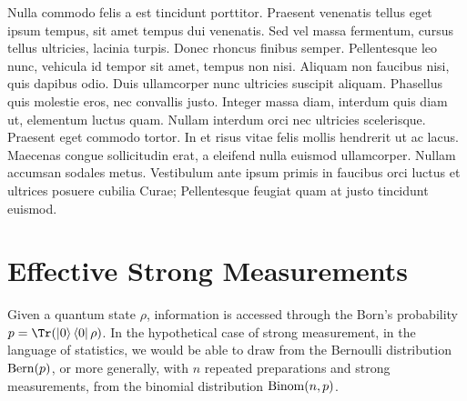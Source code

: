 \documentclass[aps,nofootinbib,prl,twocolumn,superscriptaddress]{revtex4}
\begin{document}
Nulla commodo felis a est tincidunt porttitor. Praesent venenatis tellus eget ipsum tempus, sit amet tempus dui venenatis. Sed vel massa fermentum, cursus tellus ultricies, lacinia turpis. Donec rhoncus finibus semper. Pellentesque leo nunc, vehicula id tempor sit amet, tempus non nisi. Aliquam non faucibus nisi, quis dapibus odio. Duis ullamcorper nunc ultricies suscipit aliquam. Phasellus quis molestie eros, nec convallis justo. Integer massa diam, interdum quis diam ut, elementum luctus quam. Nullam interdum orci nec ultricies scelerisque. Praesent eget commodo tortor. In et risus vitae felis mollis hendrerit ut ac lacus. Maecenas congue sollicitudin erat, a eleifend nulla euismod ullamcorper. Nullam accumsan sodales metus. Vestibulum ante ipsum primis in faucibus orci luctus et ultrices posuere cubilia Curae; Pellentesque feugiat quam at justo tincidunt euismod. 


\acknowledgments{
    
}





\appendix
\onecolumngrid

\section{Effective Strong Measurements}
\label{apx:effective-strong-measurements}

Given a quantum state $\rho$, 
information is accessed through the
Born's probability $p=\Tr(\ketbra{0}\rho)$.
In the hypothetical case of strong measurement, in the language
of statistics, we would be able to draw from 
the Bernoulli distribution $\operatorname{Bern}(p)$, or more generally, with 
$n$ repeated preparations and strong measurements, from 
the binomial distribution $\operatorname{Binom}(n,p)$.
\end{document}
